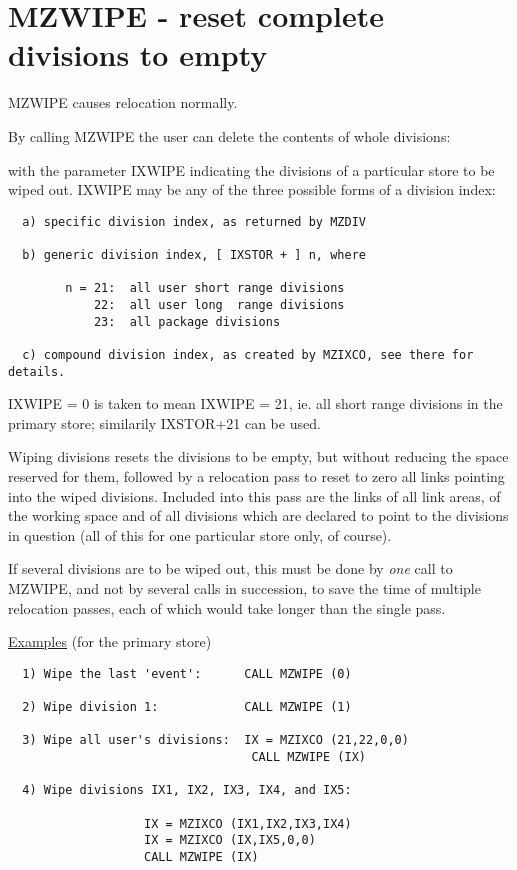 \section{MZWIPE - reset complete divisions to empty}

MZWIPE causes relocation normally.

By calling MZWIPE the user can delete the contents of
whole divisions:


with the parameter IXWIPE indicating the divisions
of a particular store to be wiped out.
IXWIPE may be any of the three possible forms of a division index:
\begin{verbatim}
  a) specific division index, as returned by MZDIV

  b) generic division index, [ IXSTOR + ] n, where

        n = 21:  all user short range divisions
            22:  all user long  range divisions
            23:  all package divisions

  c) compound division index, as created by MZIXCO, see there for details.
\end{verbatim} 

IXWIPE = 0  is taken to mean IXWIPE = 21,
ie. all short range divisions in the primary store;
similarily IXSTOR+21 can be used.

Wiping divisions resets the divisions to be empty,
but without reducing the space reserved for them,
followed by a relocation pass to reset to zero all links
pointing into the wiped divisions.
Included into this pass are the links of all link areas,
of the working space and of all divisions which are declared
to point to the divisions in question
(all of this for one particular store only, of course).

If several divisions are to be wiped out,
this must be done by {\em one} call to MZWIPE,
and not by several calls in succession,
to save the time of multiple relocation passes,
each of which would take longer than the single pass.

\ul{Examples} (for the primary store)
\begin{verbatim}
  1) Wipe the last 'event':      CALL MZWIPE (0)

  2) Wipe division 1:            CALL MZWIPE (1)

  3) Wipe all user's divisions:  IX = MZIXCO (21,22,0,0)
                                  CALL MZWIPE (IX)

  4) Wipe divisions IX1, IX2, IX3, IX4, and IX5:

                   IX = MZIXCO (IX1,IX2,IX3,IX4)
                   IX = MZIXCO (IX,IX5,0,0)
                   CALL MZWIPE (IX)
\end{verbatim} 

